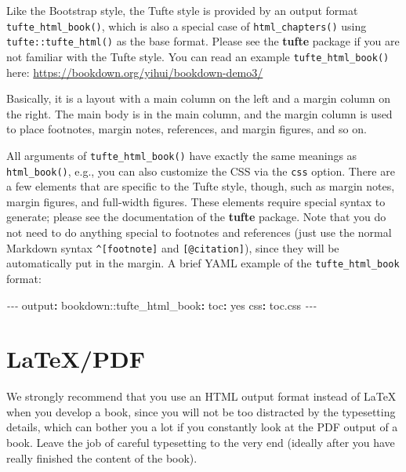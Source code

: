\documentclass[
  12pt,
]{krantz}
\newenvironment{Shaded}{\begin{snugshade}}{\end{snugshade}}
\newcommand{\AttributeTok}[1]{\textcolor[rgb]{0.77,0.63,0.00}{#1}}
\newcommand{\CharTok}[1]{\textcolor[rgb]{0.31,0.60,0.02}{#1}}
\newcommand{\FunctionTok}[1]{\textcolor[rgb]{0.00,0.00,0.00}{#1}}
\newcommand{\KeywordTok}[1]{\textcolor[rgb]{0.13,0.29,0.53}{\textbf{#1}}}
\newcommand{\PreprocessorTok}[1]{\textcolor[rgb]{0.56,0.35,0.01}{\textit{#1}}}
\theoremstyle{definition}
\theoremstyle{definition}
\theoremstyle{definition}
\theoremstyle{definition}
\theoremstyle{remark}
\begin{document}
Like the Bootstrap style, the Tufte style is provided by an output format \texttt{tufte\_html\_book()}, which is also a special case of \texttt{html\_chapters()} using \texttt{tufte::tufte\_html()} as the base format. Please see the \textbf{tufte} package \citep{R-tufte} if you are not familiar with the Tufte style. You can read an example \texttt{tufte\_html\_book()} here: \url{https://bookdown.org/yihui/bookdown-demo3/}

Basically, it is a layout with a main column on the left and a margin column on the right. The main body is in the main column, and the margin column is used to place footnotes, margin notes, references, and margin figures, and so on.

All arguments of \texttt{tufte\_html\_book()} have exactly the same meanings as \texttt{html\_book()}, e.g., you can also customize the CSS via the \texttt{css} option. There are a few elements that are specific to the Tufte style, though, such as margin notes, margin figures, and full-width figures. These elements require special syntax to generate; please see the documentation of the \textbf{tufte} package. Note that you do not need to do anything special to footnotes and references (just use the normal Markdown syntax \texttt{\^{}{[}footnote{]}} and \texttt{{[}@citation{]}}), since they will be automatically put in the margin. A brief YAML example of the \texttt{tufte\_html\_book} format:

\begin{Shaded}
\begin{Highlighting}[]
\PreprocessorTok{{-}{-}{-}}
\FunctionTok{output}\KeywordTok{:}
\AttributeTok{  bookdown:}\FunctionTok{:tufte\_html\_book}\KeywordTok{:}
\AttributeTok{    }\FunctionTok{toc}\KeywordTok{:}\AttributeTok{ }\CharTok{yes}
\AttributeTok{    }\FunctionTok{css}\KeywordTok{:}\AttributeTok{ toc.css}
\PreprocessorTok{{-}{-}{-}}
\end{Highlighting}
\end{Shaded}

\hypertarget{latexpdf}{%
\section{LaTeX/PDF}\label{latexpdf}}

We strongly recommend that you use an HTML output format instead of LaTeX when you develop a book, since you will not be too distracted by the typesetting details, which can bother you a lot if you constantly look at the PDF output of a book. Leave the job of careful typesetting to the very end (ideally after you have really finished the content of the book).
\end{document}
